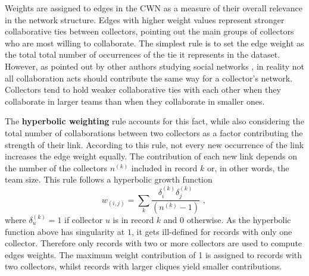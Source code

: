 {Weights are assigned to edges in the CWN as a measure of their overall relevance in the network structure. Edges with higher weight values represent stronger collaborative ties between collectors, pointing out the main groups of collectors who are most willing to collaborate. 
The simplest rule is to set the edge weight as the total total number of occurrences of the tie it represents in the dataset. However, as pointed out by other authors studying social networks \cite{Newman2001a}, in reality not all collaboration acts should contribute the same way for a collector's network. 
Collectors tend to hold weaker collaborative ties with each other when they collaborate in larger teams than when they collaborate in smaller ones. 

The \textbf{hyperbolic weighting} rule accounts for this fact, while also considering the total number of collaborations between two collectors as a factor contributing the strength of their link.
According to this rule, not every new occurrence of the link increases the edge weight equally. 
The contribution of each new link depends on the number of the collectors $n^{(k)}$ included in record $k$ or, in other words, the team size. 
This rule follows a hyperbolic growth function 
\begin{equation}
w_{(i,j)} = \sum\limits_k \frac{\delta_i^{(k)} \delta_j^{(k)}}{(n^{(k)}-1)} \mbox{ , }
\end{equation}
where $\delta^{(k)}_u = 1$ if collector $u$ is in record $k$ and $0$ otherwise.
As the hyperbolic function above has singularity at $1$, it gets ill-defined for records with only one collector. 
Therefore only records with two or more collectors are used to compute edges weights. 
The maximum weight contribution of 1 is assigned to records with two collectors, whilst records with larger cliques yield smaller contributions.\\

}
